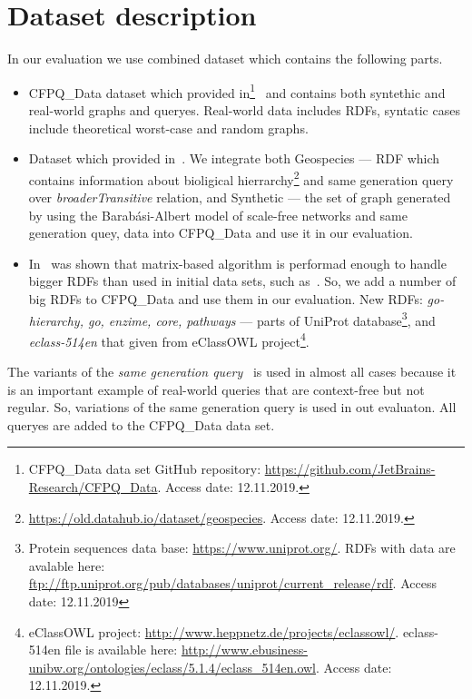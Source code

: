 \section{Dataset description}

In our evaluation we use combined dataset which contains the following parts.
\begin{itemize}
\item CFPQ\_Data dataset which provided in\footnote{CFPQ\_Data data set GitHub repository: \url{https://github.com/JetBrains-Research/CFPQ_Data}. Access date: 12.11.2019.}~\cite{Mishin:2019:ECP:3327964.3328503} and contains both syntethic and real-world graphs and queryes.
Real-world data includes RDFs, syntatic cases include theoretical worst-case and random graphs.
\item Dataset which provided in~\cite{Kuijpers:2019:ESC:3335783.3335791}. We integrate both Geospecies --- RDF which contains information about bioligical hierrarchy\footnote{\url{https://old.datahub.io/dataset/geospecies}. Access date: 12.11.2019.} and same generation query over \textit{broaderTransitive} relation, and Synthetic --- the set of graph generated by using the Barab\'asi-Albert model of scale-free networks and same generation quey, data into CFPQ\_Data and use it in our evaluation.
\item In~\cite{Mishin:2019:ECP:3327964.3328503} was shown that matrix-based algorithm is performad enough to handle bigger RDFs than used in initial data sets, such as~\cite{RDF}.
So, we add a number of big RDFs to CFPQ\_Data and use them in our evaluation.
New RDFs: \textit{go-hierarchy, go, enzime, core, pathways} --- parts of UniProt database\footnote{Protein sequences data base: \url{https://www.uniprot.org/}. RDFs with data are avalable here: \url{ftp://ftp.uniprot.org/pub/databases/uniprot/current_release/rdf}. Access date: 12.11.2019}, and \textit{eclass-514en} that given from eClassOWL project\footnote{eClassOWL project: \url{http://www.heppnetz.de/projects/eclassowl/}. eclass-514en file is available here: \url{http://www.ebusiness-unibw.org/ontologies/eclass/5.1.4/eclass_514en.owl}. Access date: 12.11.2019.}.
\end{itemize}

The variants of the \textit{same generation query}~\cite{FndDB} is used in almost all cases because it is an important example of real-world queries that are context-free but not regular.
So, variations of the same generation query is used in out evaluaton.
All queryes are added to the CFPQ\_Data data set.

